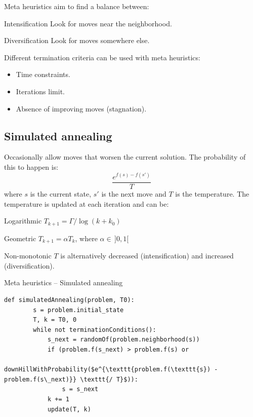Meta heuristics aim to find a balance between:
\begin{descriptionlist}
    \item[Intensification] 
        Look for moves near the neighborhood.
    \item[Diversification] 
        Look for moves somewhere else.
\end{descriptionlist}

Different termination criteria can be used with meta heuristics:
\begin{itemize}
    \item Time constraints.
    \item Iterations limit.
    \item Absence of improving moves (stagnation).
\end{itemize}


\subsection{Simulated annealing}
Occasionally allow moves that worsen the current solution.
The probability of this to happen is:
\[
    \frac{e^{f(s) - f(s')}}{T}
\]
where $s$ is the current state, $s'$ is the next move and $T$ is the temperature.
The temperature is updated at each iteration and can be:
\begin{descriptionlist}
    \item[Logarithmic] $T_{k+1} = \Gamma / \log(k + k_0) $
    \item[Geometric] $T_{k+1} = \alpha T_k$, where $\alpha \in\, ]0, 1[$
    \item[Non-monotonic] $T$ is alternatively decreased (intensification) and increased (diversification).
\end{descriptionlist}

\begin{algorithm}
\caption{Meta heuristics -- Simulated annealing}
\begin{lstlisting}[mathescape=true]
    def simulatedAnnealing(problem, T0):
        s = problem.initial_state
        T, k = T0, 0
        while not terminationConditions():
            s_next = randomOf(problem.neighborhood(s))
            if (problem.f(s_next) > problem.f(s) or
               downHillWithProbability($e^{\texttt{problem.f(\texttt{s}) - problem.f(s\_next)}} \texttt{/ T}$)):
                s = s_next
            k += 1
            update(T, k)
\end{lstlisting}
\end{algorithm}


